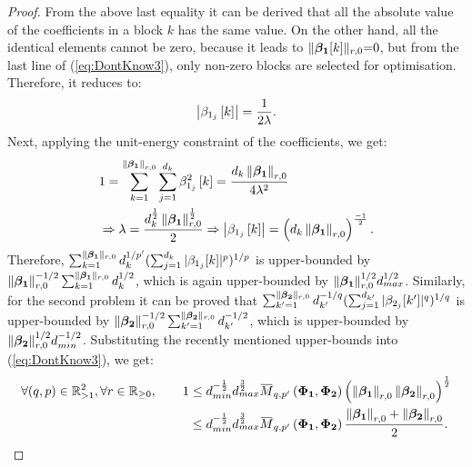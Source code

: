 \begin{proof}
From the above last equality it can be derived that all the absolute value of the coefficients in a block $k$ has the same value. 
On the other hand, all the identical elements cannot be zero, because it leads to $\Vert \boldsymbol{\beta_1} [k]\Vert_{r,0} {=} 0 $, but from the last line of (\ref{eq:DontKnow3}), only non-zero blocks are selected for optimisation.
Therefore, it reduces to:
\begin{equation*}
\left\lvert\beta_{1_j} \left[ k \right]\right\rvert =
\frac{1}{2 \lambda}.
\end{equation*}
Next, applying the unit-energy constraint of the coefficients, we get:
\begin{equation*}
\begin{aligned}
&1 = \displaystyle\sum_{k=1}^{\left\lVert\boldsymbol{\beta_1}\right\rVert_{r,0}} \displaystyle\sum_{j=1}^{d_k} \beta_{1_j}^2 \left[ k \right] =
\frac{d_k \left\lVert\boldsymbol{\beta_1}\right\rVert_{r,0}}{4 \lambda^2} \\
& \Rightarrow \lambda = \frac{d_k^{\frac12} \left\lVert\boldsymbol{\beta_1}\right\rVert^{\frac12}_{r,0}}{2} 
\Rightarrow \left\lvert\beta_{1_j} \left[ k \right]\right\rvert = \left( d_k \left\lVert\boldsymbol{\beta_1}\right\rVert_{r,0} \right)^ \frac{-1}{2}.
\end{aligned}
\end{equation*}
Therefore, $\sum_{k=1}^{\Vert\boldsymbol{\beta_1} \Vert_{r,0}} d_k^{1/p'} (\sum_{j=1}^{d_k} \vert \beta_{1_j} [k] \vert ^p)^{1/p}$ is upper-bounded by $\Vert\boldsymbol{\beta_1} \Vert_{r,0}^{-1/2} \sum_{k=1}^{\Vert\boldsymbol{\beta_1} \Vert_{r,0}} d_k^{1/2}$, which is again upper-bounded by $\Vert\boldsymbol{\beta_1} \Vert_{r,0}^{1/2} d_{max}^{1/2}$.
Similarly, for the second problem it can be proved that $\sum_{k'=1}^{\Vert\boldsymbol{\beta_2} \Vert_{r,0}} d_{k'}^{-1/q} (\sum_{j=1}^{d_{k'}} \vert \beta_{2_j} [k'] \vert ^q)^{1/q}$ is upper-bounded by $\Vert\boldsymbol{\beta_2} \Vert_{r,0}^{-1/2} \sum_{k'=1}^{\Vert\boldsymbol{\beta_2} \Vert_{r,0}} d_{k'}^{-1/2}$, which is upper-bounded by $\Vert\boldsymbol{\beta_2} \Vert_{r,0}^{1/2} d_{min}^{-1/2}$.
Substituting the recently mentioned upper-bounds into (\ref{eq:DontKnow3}), we get:
\begin{equation*}
\begin{aligned}
\forall (q , p) \in \mathbb{R}^2_{> 1}, \forall r \in \mathbb{R}_{\geq 0}, \qquad
1 &\leq 
\mycolor{d_{min}^{-\frac12} d_{max}^{\frac32}}
\overbar{M}_{q,p'}\myparanthese{\myPhiOne , \myPhiTwo} \myparanthese{\mynorm{\mybetao}_{r,0} \mynorm{\mybetaTwo}_{r,0}}^{\frac12} \\
&\mycolor{\leq
d_{min}^{-\frac12} d_{max}^{\frac32} \overbar{M}_{q,p'}\myparanthese{\myPhiOne , \myPhiTwo} \frac{\mynorm{\mybetao}_{r,0} + \mynorm{\mybetaTwo}_{r,0}}{2}.}
\end{aligned}
\end{equation*}


\end{proof}
